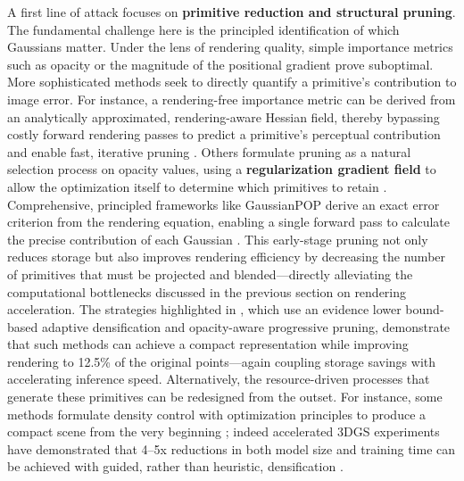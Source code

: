 \documentclass[11pt,a4paper]{article}
\begin{document}
A first line of attack focuses on \textbf{primitive reduction and structural pruning}. The fundamental challenge here is the principled identification of which Gaussians matter. Under the lens of rendering quality, simple importance metrics such as opacity or the magnitude of the positional gradient prove suboptimal. More sophisticated methods seek to directly quantify a primitive's contribution to image error. For instance, a rendering-free importance metric can be derived from an analytically approximated, rendering-aware Hessian field, thereby bypassing costly forward rendering passes to predict a primitive's perceptual contribution and enable fast, iterative pruning \cite{arxiv:2606.09074v3}. Others formulate pruning as a natural selection process on opacity values, using a \textbf{regularization gradient field} to allow the optimization itself to determine which primitives to retain \cite{arxiv:2511.16980v1}. Comprehensive, principled frameworks like GaussianPOP derive an exact error criterion from the rendering equation, enabling a single forward pass to calculate the precise contribution of each Gaussian \cite{arxiv:2602.06830v1}. This early-stage pruning not only reduces storage but also improves rendering efficiency by decreasing the number of primitives that must be projected and blended---directly alleviating the computational bottlenecks discussed in the previous section on rendering acceleration. The strategies highlighted in \cite{arxiv:2604.01884v1}, which use an evidence lower bound-based adaptive densification and opacity-aware progressive pruning, demonstrate that such methods can achieve a compact representation while improving rendering to 12.5\% of the original points---again coupling storage savings with accelerating inference speed. Alternatively, the resource-driven processes that generate these primitives can be redesigned from the outset. For instance, some methods formulate density control with optimization principles to produce a compact scene from the very beginning \cite{arxiv:2505.05587v1}; indeed accelerated 3DGS experiments have demonstrated that 4--5x reductions in both model size and training time can be achieved with guided, rather than heuristic, densification \cite{arxiv:2406.15643v1}.
\end{document}

